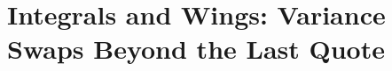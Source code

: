 %
\renewcommand{\figdir}{figures/ch05}
\chapter[Integrals and wings: variance swaps beyond the last quote]{Integrals
and Wings: Variance Swaps Beyond the Last Quote}
\label{ch:vs}

